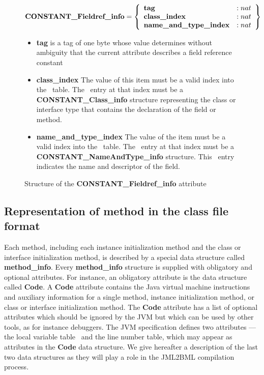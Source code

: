 \begin{figure}
$$
\mbox{\rm\textbf{CONSTANT\_Fieldref\_info}} =  \left\{\begin{array}{ll} 
                                                   \mbox{\rm\textbf{tag}}    & :   nat \\
                                                   \mbox{\rm\textbf{class\_index}}     & :   nat \\
						   \mbox{\rm\textbf{name\_and\_type\_index}} & : nat
	                        \end{array} \right\}$$

\begin{itemize}
\item \textbf{tag} is a tag of one byte  whose value  determines without 
       ambiguity that the current attribute describes a field reference constant

\item \textbf{class\_index} The value of this item must be a valid index into the \constantPool \ table. 
                            The \constantPool \ entry at that index must be a \textbf{CONSTANT\_Class\_info} structure
			    representing the class or interface type that contains the declaration of the field or method.

\item \textbf{name\_and\_type\_index}   The value of the item must be a valid index into the \constantPool \ table.
                                        The \constantPool \ entry at that index must be a \textbf{CONSTANT\_NameAndType\_info }
					structure. This \constantPool \ entry indicates the name and descriptor of the field.

\end{itemize}
\caption{ { \sc Structure of the } \textbf{CONSTANT\_Fieldref\_info} { \sc attribute }  }
\label{fldConstant}
\end{figure}

\subsection{Representation of method in the class file format}

Each method, including each instance initialization method and the class or interface initialization method, is described by a special data structure
called \textbf{method\_info}. Every \textbf{method\_info} structure is supplied with obligatory and optional attributes.
For instance,  an obligatory attribute is  the data structure called  \textbf{Code}.
A \textbf{Code} attribute contains the Java virtual machine instructions and auxiliary information for a single method, instance initialization method,
 or class or interface initialization method.
The \textbf{Code} attribute has a list of optional  attributes which should be ignored by the JVM but which can be used by other tools, as for instance debuggers.
The JVM specification defines two attributes --- the local variable table \ and the line number table,  which may appear
 as attributes in the  \textbf{Code} data structure.
We give hereafter a description of the last two data structures as they will play a role in the JML2BML compilation process. 

